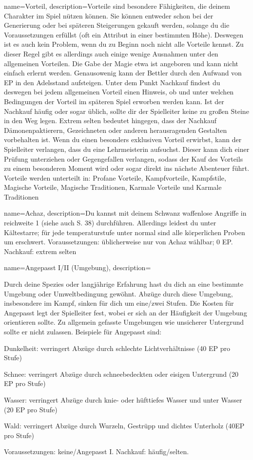 {
    name={Vorteil},
    description={Vorteile sind besondere Fähigkeiten, die deinem Charakter im Spiel nützen können. Sie können entweder schon bei der Generierung oder bei späteren Steigerungen gekauft werden, solange du die Voraussetzungen erfüllst (oft ein Attribut in einer bestimmten Höhe). Deswegen ist es auch kein Problem, wenn du zu Beginn noch nicht alle Vorteile kennst. Zu dieser Regel gibt es allerdings auch einige wenige Ausnahmen unter den allgemeinen Vorteilen. Die Gabe der Magie etwa ist angeboren und kann nicht einfach erlernt werden. Genausowenig kann der Bettler durch den Aufwand von EP in den Adelsstand aufsteigen. Unter dem Punkt Nachkauf findest du deswegen bei jedem allgemeinen Vorteil einen Hinweis, ob und unter welchen Bedingungen der Vorteil im späteren Spiel erworben werden kann. Ist der Nachkauf häufig oder sogar üblich, sollte dir der Spielleiter keine zu großen Steine in den Weg legen. Extrem selten bedeutet hingegen, dass der Nachkauf Dämonenpaktierern, Gezeichneten oder anderen herausragenden Gestalten vorbehalten ist. Wenn du einen besonders exklusiven Vorteil erwirbst, kann der Spielleiter verlangen, dass du eine Lehrmeisterin aufsuchst. Dieser kann dich einer Prüfung unterziehen oder Gegengefallen verlangen, sodass der Kauf des Vorteils zu einem besonderen Moment wird oder sogar direkt ins nächste Abenteuer führt. Vorteile werden unterteilt in: Profane Vorteile, Kampfvorteile, Kampfstile, Magische Vorteile, Magische Traditionen, Karmale Vorteile und Karmale Traditionen}}

{
    name={Achaz},
    description={Du kannst mit deinem Schwanz waffenlose Angriffe in \gls{reichweite} 1 (siehe auch S. 38) durchführen. Allerdings leidest du unter Kältestarre; für jede \gls{temperaturstufe} unter normal sind alle körperlichen Proben um  erschwert. Voraussetzungen: üblicherweise nur von Achaz wählbar; 0 EP. Nachkauf: extrem selten}}

{
    name={Angepasst I/II (Umgebung)},
    description={Durch deine Spezies oder langjährige Erfahrung hast du dich an eine bestimmte Umgebung oder Umweltbedingung gewöhnt. Abzüge durch diese Umgebung, insbesondere im Kampf, sinken für dich um eine/zwei Stufen. Die Kosten für Angepasst legt der Spielleiter fest, wobei er sich an der Häufigkeit der Umgebung orientieren sollte. Zu allgemein gefasste Umgebungen wie \glqq unsicherer Untergrund\grqq{} sollte er nicht zulassen. Beispiele für Angepasst sind:
\begin{description}
\item Dunkelheit: verringert Abzüge durch schlechte Lichtverhältnisse (40 EP pro Stufe)
\item Schnee: verringert Abzüge durch schneebedeckten oder eisigen Untergrund (20 EP pro Stufe)
\item Wasser: verringert Abzüge durch knie- oder hüfttiefes Wasser und unter Wasser (20 EP pro Stufe)
\item Wald: verringert Abzüge durch Wurzeln, Gestrüpp und dichtes Unterholz (40EP pro Stufe)
\end{description}
Voraussetzungen: keine/Angepasst I. Nachkauf: häufig/selten.}}

